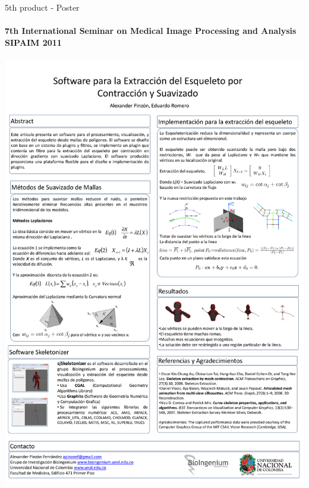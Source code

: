 \documentclass[10pt, compress, english]{beamer}
\begin{document}
\begin{frame}{5th product - Poster}


\framesubtitle{{\small{}7th International Seminar on Medical Image Processing and
Analysis SIPAIM 2011}}


\noindent \begin{center}
\includegraphics[height=0.8\textheight]{img/PosterSIPAIM2011}
\par\end{center}

\end{frame}
\end{document}
